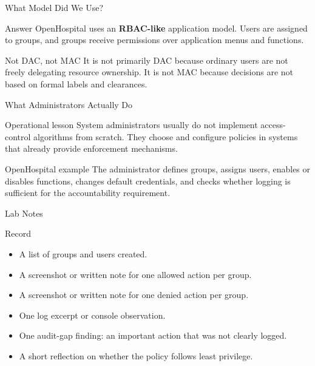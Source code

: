 \documentclass[presentation]{beamer}
\begin{document}
\begin{frame}[c]{What Model Did We Use?}
\begin{block}{Answer}
OpenHospital uses an \textbf{RBAC-like} application model. Users are assigned to groups, and groups
receive permissions over application menus and functions.
\end{block}

\begin{exampleblock}{Not DAC, not MAC}
It is not primarily DAC because ordinary users are not freely delegating resource ownership. It is
not MAC because decisions are not based on formal labels and clearances.
\end{exampleblock}
\end{frame}

\begin{frame}[c]{What Administrators Actually Do}
\begin{block}{Operational lesson}
System administrators usually do not implement access-control algorithms from scratch. They choose
and configure policies in systems that already provide enforcement mechanisms.
\end{block}

\begin{exampleblock}{OpenHospital example}
The administrator defines groups, assigns users, enables or disables functions, changes default
credentials, and checks whether logging is sufficient for the accountability requirement.
\end{exampleblock}
\end{frame}

\begin{frame}[c]{Lab Notes}
\begin{block}{Record}
\begin{itemize}
    \item A list of groups and users created.
    \item A screenshot or written note for one allowed action per group.
    \item A screenshot or written note for one denied action per group.
    \item One log excerpt or console observation.
    \item One audit-gap finding: an important action that was not clearly logged.
    \item A short reflection on whether the policy follows least privilege.
\end{itemize}
\end{block}
\end{frame}
\end{document}
